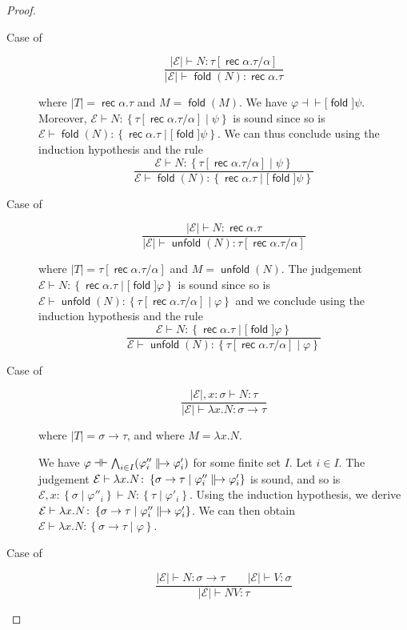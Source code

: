 \documentclass[%
  a4paper,
  UKenglish,
  cleveref,
  autoref,
  thm-restate,
  numberwithinsect,
]{lipics-v2021}
\newcommand\thesis{\vdash}
\newcommand\defthesisiff{\dashv\vdash}
\newcommand\thesisiff{\mathrel{\defthesisiff}}
\newcommand\Env{\mathcal{E}}    %
\newcommand\term[1]{\mathsf{#1}}
\newcommand\type[1]{\term{#1}}
\newcommand\fold{\mathop{\term{fold}}}
\newcommand\unfold{\mathop{\term{unfold}}}
\newcommand\arrow\to
\newcommand\rec{\mathop{\type{rec}}}	%
\newcommand\TV{\alpha}		%
\newcommand\reft[1]{\left\{ #1 \right\}}
\newcommand\defrealto{\mathrel\parallel\joinrel\to}
\newcommand\realto{\mathrel{\defrealto}}
\newcommand\PT{\tau}		%
\newcommand\PTbis{\sigma}	%
\newcommand\RT{T}               %
\newcommand\UPT[1]{\vert #1 \vert}        %
\newcommand\form[1]{\lbrack #1 \rbrack}
\begin{document}
\begin{proof}
\begin{description}
\item[Case of]
\[
\dfrac{\UPT\Env \thesis N \colon \PT[\rec\TV.\PT / \TV]}
  {\UPT\Env \thesis \fold(N) \colon \rec\TV.\PT}
\]

\noindent
where $\UPT\RT = \rec\TV.\PT$ and $M = \fold(M)$.
%
We have $\varphi \thesisiff \form{\fold}\psi$.
Moreover, 
$\Env \thesis N \colon \reft{\PT[\rec\TV.\PT / \TV] \mid \psi}$
is sound
since so is
$\Env \thesis \fold(N) \colon \reft{\rec\TV.\PT \mid \form\fold\psi}$.
We can thus conclude using the induction hypothesis and the rule
\[
\dfrac{\Env \thesis N \colon \reft{\PT[\rec\TV.\PT/\TV] \mid \psi}}
  {\Env \thesis \fold(N) \colon \reft{\rec\TV.\PT \mid \form\fold \psi}}
\]

\item[Case of]
\[
\dfrac{\UPT\Env \thesis N \colon \rec\TV.\PT}
  {\UPT\Env \thesis \unfold(N) \colon \PT[\rec\TV.\PT / \TV]}
\]

\noindent
where $\UPT\RT = \PT[\rec\TV.\PT/\TV]$
and $M = \unfold(N)$.
%
The judgement 
$\Env \thesis N \colon \reft{\rec\TV.\PT \mid \form\fold \varphi}$
is sound
since so is
$\Env \thesis \unfold(N) \colon \reft{\PT[\rec\TV.\PT / \TV] \mid  \varphi}$
and we conclude using the induction hypothesis and the rule
\[
\dfrac{\Env \thesis N \colon \reft{\rec\TV.\PT \mid \form\fold \varphi}}
  {\Env \thesis \unfold(N) \colon \reft{\PT[\rec\TV.\PT/\TV] \mid \varphi}}
\]

\item[Case of]
\[
\dfrac{\UPT\Env,x\colon\PTbis \thesis N \colon \PT}
  {\UPT\Env \thesis \lambda x.N \colon \PTbis \arrow \PT}
\]

\noindent
where $\UPT\RT = \PTbis \arrow \PT$,
and where $M = \lambda x.N$.

We have $\varphi \thesisiff \bigwedge_{i \in I}(\varphi''_i \realto \varphi'_i)$
for some finite set $I$.
Let $i \in I$.
The judgement
\(
  \Env
  \thesis
  \lambda x.N \colon
  \reft{\PTbis \arrow \PT \mid \varphi''_i \realto \varphi'_i}
\)
is sound,
and so is
\(
  \Env, x \colon \reft{\PTbis \mid \varphi''_i}
  \thesis
  N \colon
  \reft{\PT \mid \varphi'_i}
\).
Using the induction hypothesis, we derive
\(
  \Env
  \thesis
  \lambda x.N \colon
  \reft{\PTbis \arrow \PT \mid \varphi''_i \realto \varphi'_i}
\).
We can then obtain
\(
  \Env
  \thesis
  \lambda x.N \colon
  \reft{\PTbis \arrow \PT \mid \varphi}
\).


\item[Case of]
\[
\dfrac{\UPT\Env \thesis N \colon \PTbis \arrow \PT
  \qquad
  \UPT\Env \thesis V \colon \PTbis}
  {\UPT\Env \thesis N V \colon \PT}
\]


\end{description}
\end{proof}
\end{document}
